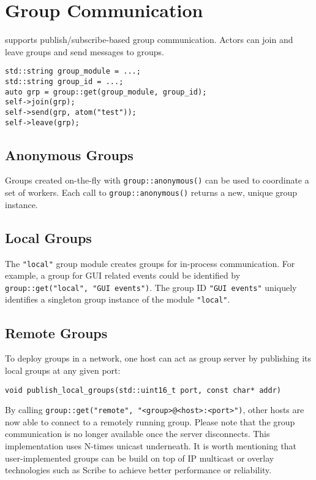 \section{Group Communication}
\label{Sec::Group}

\libcppa supports publish/subscribe-based group communication.
Actors can join and leave groups and send messages to groups.

\begin{lstlisting}
std::string group_module = ...;
std::string group_id = ...;
auto grp = group::get(group_module, group_id);
self->join(grp);
self->send(grp, atom("test"));
self->leave(grp);
\end{lstlisting}

\subsection{Anonymous Groups}
\label{Sec::Group::Anonymous}

Groups created on-the-fly with \lstinline^group::anonymous()^ can be used to coordinate a set of workers.
Each call to \lstinline^group::anonymous()^ returns a new, unique group instance.

\subsection{Local Groups}
\label{Sec::Group::Local}

The \lstinline^"local"^ group module creates groups for in-process communication.
For example, a group for GUI related events could be identified by \lstinline^group::get("local", "GUI events")^.
The group ID \lstinline^"GUI events"^ uniquely identifies a singleton group instance of the module \lstinline^"local"^.

\subsection{Remote Groups}
\label{Sec::Group::RemoteGroups}

To deploy groups in a network, one host can act as group server by publishing its local groups at any given port:

\begin{lstlisting}
void publish_local_groups(std::uint16_t port, const char* addr)
\end{lstlisting}

By calling \lstinline^group::get("remote", "<group>@<host>:<port>")^, other hosts are now able to connect to a remotely running group.
Please note that the group communication is no longer available once the server disconnects.
This implementation uses N-times unicast underneath.
It is worth mentioning that user-implemented groups can be build on top of IP multicast or overlay technologies such as Scribe to achieve better performance or reliability.

